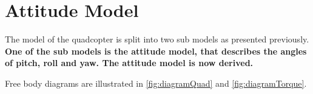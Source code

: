 \section{Attitude Model}
The model of the quadcopter is split into two sub models as presented previously. \textbf{One of the sub models is the attitude model, that describes the angles of pitch, roll and yaw. The attitude model is now derived.}


Free body diagrams are illustrated in \autoref{fig:diagramQuad} and \autoref{fig:diagramTorque}. 

%
%

